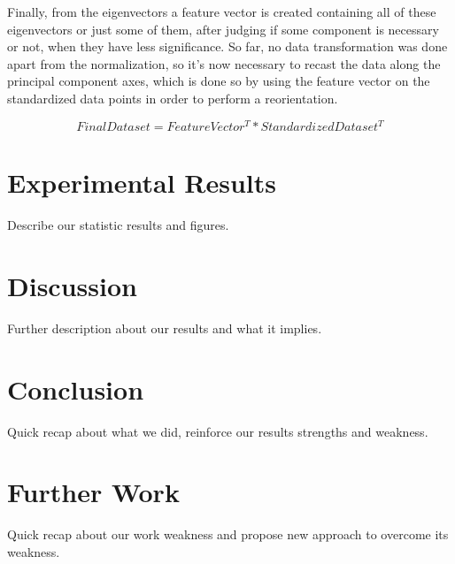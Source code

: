 \documentclass[conference]{IEEEtran}
\newcommand{\reviewUrgent}[1]{{\color{red} #1}} %
\begin{document}
Finally, from the eigenvectors a feature vector is created containing all of these 
eigenvectors or just some of them, after judging if some component is necessary or 
not, when they have less significance. So far, no data transformation was done apart 
from the normalization, so it's now necessary to recast the data along the principal 
component axes, which is done so by using the feature vector on the standardized 
data points in order to perform a reorientation.

$$FinalDataset = FeatureVector^{T} * StandardizedDataset^{T}$$

\section{Experimental Results}
\reviewUrgent{Describe our statistic results and figures.}


\section{Discussion}
\reviewUrgent{Further description about our results and what it implies.}


\section{Conclusion}
\reviewUrgent{Quick recap about what we did, reinforce our results strengths and weakness.}

\section{Further Work}
\reviewUrgent{Quick recap about our work weakness and propose new approach to overcome its weakness.}



\end{document}
